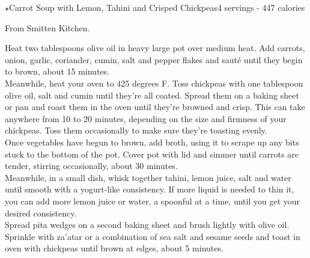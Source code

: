 \begin{recipe}{$\star$Carrot Soup with Lemon, Tahini and Crisped Chickpeas}{4 servings - 447 calories}{}

\freeform From Smitten Kitchen.\\


Heat two tablespoons olive oil in heavy large pot over medium heat. Add carrots, onion, garlic, coriander, cumin, salt and pepper flakes and sauté until they begin to brown, about 15 minutes.\\

Meanwhile, heat your oven to 425 degrees F. Toss chickpeas with one tablespoon olive oil, salt and cumin until they’re all coated. Spread them on a baking sheet or pan and roast them in the oven until they’re browned and crisp. This can take anywhere from 10 to 20 minutes, depending on the size and firmness of your chickpeas. Toss them occasionally to make sure they’re toasting evenly.\\

Once vegetables have begun to brown, add broth, using it to scrape up any bits stuck to the bottom of the pot. Cover pot with lid and simmer until carrots are tender, stirring occasionally, about 30 minutes.\\

Meanwhile, in a small dish, whisk together tahini, lemon juice, salt and water until smooth with a yogurt-like consistency. If more liquid is needed to thin it, you can add more lemon juice or water, a spoonful at a time, until you get your desired consistency.\\

Spread pita wedges on a second baking sheet and brush lightly with olive oil. Sprinkle with za’atar or a combination of sea salt and sesame seeds and toast in oven with chickpeas until brown at edges, about 5 minutes.


\end{recipe}
